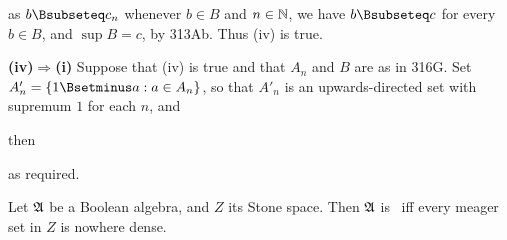 {

\noindent as $b\Bsubseteq c_n$ whenever $b\in B$ and $n\in\Bbb N$,
we have $b\Bsubseteq c$ for every $b\in B$, and $\sup B=c$, by
313Ab.   Thus (iv) is true.

\medskip

{\bf (iv)$\Rightarrow$(i)} Suppose that (iv) is true and
that $A_n$ and $B$ are as in 316G.    Set
$A'_n=\{1\Bsetminus a:a\in A_n\}$, so that $A'_n$ is an upwards-directed
set with supremum $1$ for each $n$, and


\noindent then


\noindent as required.
}%

 Let $\frak A$ be a Boolean algebra, and $Z$ its
Stone space.   Then $\frak A$ is \wsid\ iff
every meager set in $Z$ is nowhere dense.

